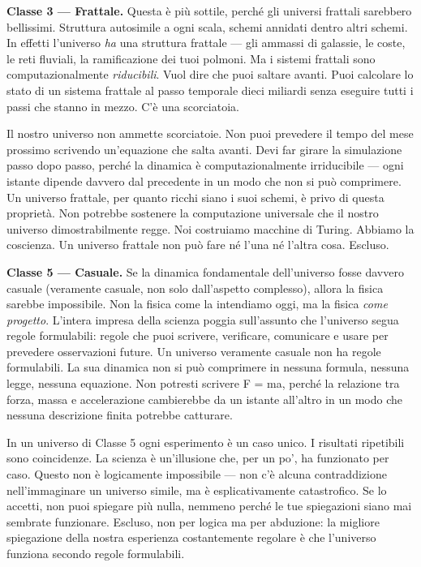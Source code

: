 \documentclass[11pt, twoside, openright]{book}
\begin{document}
\textbf{Classe 3 --- Frattale.} Questa è più sottile, perché gli universi frattali sarebbero bellissimi. Struttura autosimile a ogni scala, schemi annidati dentro altri schemi. In effetti l'universo \textit{ha} una struttura frattale --- gli ammassi di galassie, le coste, le reti fluviali, la ramificazione dei tuoi polmoni. Ma i sistemi frattali sono computazionalmente \textit{riducibili}. Vuol dire che puoi saltare avanti. Puoi calcolare lo stato di un sistema frattale al passo temporale dieci miliardi senza eseguire tutti i passi che stanno in mezzo. C'è una scorciatoia.

Il nostro universo non ammette scorciatoie. Non puoi prevedere il tempo del mese prossimo scrivendo un'equazione che salta avanti. Devi far girare la simulazione passo dopo passo, perché la dinamica è computazionalmente irriducibile --- ogni istante dipende davvero dal precedente in un modo che non si può comprimere. Un universo frattale, per quanto ricchi siano i suoi schemi, è privo di questa proprietà. Non potrebbe sostenere la computazione universale che il nostro universo dimostrabilmente regge. Noi costruiamo macchine di Turing. Abbiamo la coscienza. Un universo frattale non può fare né l'una né l'altra cosa. Escluso.

\textbf{Classe 5 --- Casuale.} Se la dinamica fondamentale dell'universo fosse davvero casuale (veramente casuale, non solo dall'aspetto complesso), allora la fisica sarebbe impossibile. Non la fisica come la intendiamo oggi, ma la fisica \textit{come progetto}. L'intera impresa della scienza poggia sull'assunto che l'universo segua regole formulabili: regole che puoi scrivere, verificare, comunicare e usare per prevedere osservazioni future. Un universo veramente casuale non ha regole formulabili. La sua dinamica non si può comprimere in nessuna formula, nessuna legge, nessuna equazione. Non potresti scrivere F = ma, perché la relazione tra forza, massa e accelerazione cambierebbe da un istante all'altro in un modo che nessuna descrizione finita potrebbe catturare.

In un universo di Classe 5 ogni esperimento è un caso unico. I risultati ripetibili sono coincidenze. La scienza è un'illusione che, per un po', ha funzionato per caso. Questo non è logicamente impossibile --- non c'è alcuna contraddizione nell'immaginare un universo simile, ma è esplicativamente catastrofico. Se lo accetti, non puoi spiegare più nulla, nemmeno perché le tue spiegazioni siano mai sembrate funzionare. Escluso, non per logica ma per abduzione: la migliore spiegazione della nostra esperienza costantemente regolare è che l'universo funziona secondo regole formulabili.
\end{document}
